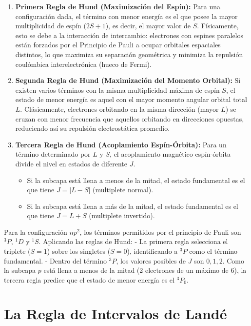 \begin{enumerate}
    \item \textbf{Primera Regla de Hund (Maximización del Espín):} Para una configuración dada, el término con menor energía es el que posee la mayor multiplicidad de espín ($2S+1$), es decir, el mayor valor de $S$. Físicamente, esto se debe a la interacción de intercambio: electrones con espines paralelos están forzados por el Principio de Pauli a ocupar orbitales espaciales distintos, lo que maximiza su separación geométrica y minimiza la repulsión coulómbica interelectrónica (hueco de Fermi).
    \item \textbf{Segunda Regla de Hund (Maximización del Momento Orbital):} Si existen varios términos con la misma multiplicidad máxima de espín $S$, el estado de menor energía es aquel con el mayor momento angular orbital total $L$. Clásicamente, electrones orbitando en la misma dirección (mayor $L$) se cruzan con menor frecuencia que aquellos orbitando en direcciones opuestas, reduciendo así su repulsión electrostática promedio.
    \item \textbf{Tercera Regla de Hund (Acoplamiento Espín-Órbita):} Para un término determinado por $L$ y $S$, el acoplamiento magnético espín-órbita divide el nivel en estados de diferente $J$. 
    \begin{itemize}
        \item Si la subcapa está llena a menos de la mitad, el estado fundamental es el que tiene $J = |L - S|$ (multiplete normal).
        \item Si la subcapa está llena a más de la mitad, el estado fundamental es el que tiene $J = L + S$ (multiplete invertido).
    \end{itemize}
\end{enumerate}

Para la configuración $np^2$, los términos permitidos por el principio de Pauli son $^3P$, $^1D$ y $^1S$. Aplicando las reglas de Hund:
- La primera regla selecciona el triplete ($S=1$) sobre los singletes ($S=0$), identificando a $^3P$ como el término fundamental.
- Dentro del término $^3P$, los valores posibles de $J$ son $0, 1, 2$. Como la subcapa $p$ está llena a menos de la mitad (2 electrones de un máximo de 6), la tercera regla predice que el estado de menor energía es el $^3P_0$.

\section{La Regla de Intervalos de Landé}

